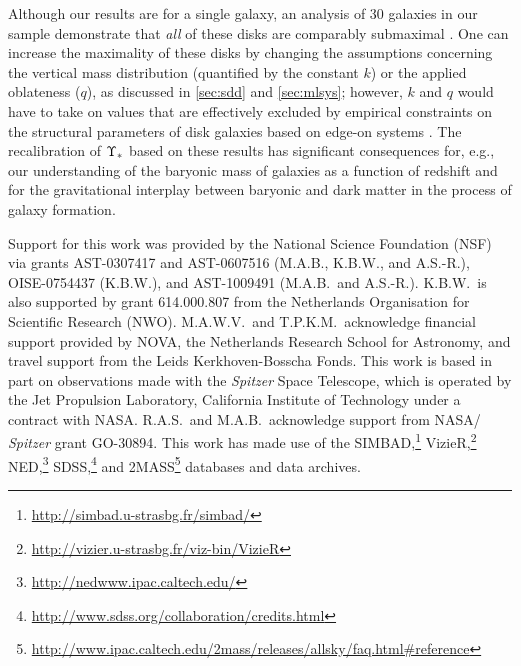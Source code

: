 \documentclass[apj,iop,numberedappendix]{emulateapj}
\begin{document}
Although our results are for a single galaxy, an analysis of 30 galaxies in our
sample demonstrate that {\it all} of these disks are comparably submaximal
\citep[\pV;][]{TPKMPhD}.  One can increase the maximality of these disks by
changing the assumptions concerning the vertical mass distribution (quantified
by the constant $k$) or the applied oblateness ($q$), as discussed in \sects
\ref{sec:sdd} and \ref{sec:mlsys}; however, $k$ and $q$ would have to take on
values that are effectively excluded by empirical constraints on the structural
parameters of disk galaxies based on edge-on systems \citep[e.g.,][]{KregelPhD}.
The recalibration of $\Upsilon_\ast$ based on these results has significant consequences
for, e.g., our understanding of the baryonic mass of galaxies as a function of
redshift and for the gravitational interplay between baryonic and dark matter in
the process of galaxy formation.

\acknowledgments Support for this work was provided by the National Science
Foundation (NSF) via grants AST-0307417 and AST-0607516 (M.A.B., K.B.W., and
A.S.-R.), OISE-0754437 (K.B.W.), and AST-1009491 (M.A.B.\ and A.S.-R.).  K.B.W.\
is also supported by grant 614.000.807 from the Netherlands Organisation for
Scientiﬁc Research (NWO).  M.A.W.V.\ and T.P.K.M.\ acknowledge financial support
provided by NOVA, the Netherlands Research School for Astronomy, and travel
support from the Leids Kerkhoven-Bosscha Fonds. This work is based in part on
observations made with the {\it Spitzer} Space Telescope, which is operated by
the Jet Propulsion Laboratory, California Institute of Technology under a
contract with NASA.  R.A.S.\ and M.A.B.\ acknowledge support from NASA/{\it
Spitzer} grant GO-30894.  This work has made use of the SIMBAD,\footnote{
%
\url{http://simbad.u-strasbg.fr/simbad/}
%
} VizieR,\footnote{
%
\url{http://vizier.u-strasbg.fr/viz-bin/VizieR}
%
} NED,\footnote{
%
\url{http://nedwww.ipac.caltech.edu/}
%
} SDSS,\footnote{
%
\url{http://www.sdss.org/collaboration/credits.html}
%
} and 2MASS\footnote{
%
\url{http://www.ipac.caltech.edu/2mass/releases/allsky/faq.html\#reference}
%
} databases and data archives.

\end{document}
